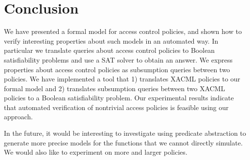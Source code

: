 \section{Conclusion}

We have presented a formal model for access control policies, and shown how to
verify interesting properties about such models in an automated way.
In particular we translate queries about access control policies
to Boolean satisfiability problems and use a SAT solver to obtain an answer.
We express properties about access control policies as subsumption queries
between two policies.
We have implemented a tool that 1) translates XACML policies to our formal model
and 2) translates subsumption queries between two XACML policies to
a Boolean satisfiability problem.
Our experimental results
indicate that automated verification of nontrivial access policies is
feasible using our approach.

In the future, it would be interesting to investigate using predicate abstraction to
generate more precise models for the functions that we cannot directly
simulate.  We would also like to experiment on more and larger
policies.


